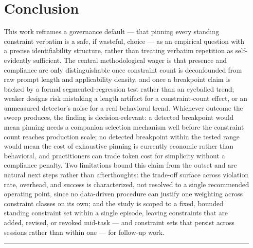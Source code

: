\documentclass[11pt]{article}
\begin{document}
\section{Conclusion}

This work reframes a governance default --- that pinning every standing constraint verbatim is a safe, if wasteful, choice --- as an empirical question with a precise identifiability structure, rather than treating verbatim repetition as self-evidently sufficient. The central methodological wager is that presence and compliance are only distinguishable once constraint count is deconfounded from raw prompt length and applicability density, and once a breakpoint claim is backed by a formal segmented-regression test rather than an eyeballed trend; weaker designs risk mistaking a length artifact for a constraint-count effect, or an unmeasured detector's noise for a real behavioral trend. Whichever outcome the sweep produces, the finding is decision-relevant: a detected breakpoint would mean pinning needs a companion selection mechanism well before the constraint count reaches production scale; no detected breakpoint within the tested range would mean the cost of exhaustive pinning is currently economic rather than behavioral, and practitioners can trade token cost for simplicity without a compliance penalty. Two limitations bound this claim from the outset and are natural next steps rather than afterthoughts: the trade-off surface across violation rate, overhead, and success is characterized, not resolved to a single recommended operating point, since no data-driven procedure can justify one weighting across constraint classes on its own; and the study is scoped to a fixed, bounded standing constraint set within a single episode, leaving constraints that are added, revised, or revoked mid-task --- and constraint sets that persist across sessions rather than within one --- for follow-up work.

\vspace{1em}
\hrule
\vspace{1em}
\end{document}
